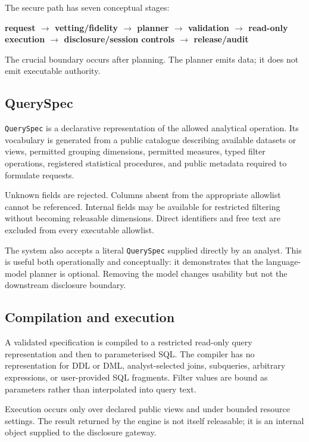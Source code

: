 \documentclass[11pt,a4paper]{article}
\begin{document}
The secure path has seven conceptual stages:

\begin{center}
\textbf{request $\rightarrow$ vetting/fidelity $\rightarrow$ planner $\rightarrow$
validation $\rightarrow$ read-only execution $\rightarrow$ disclosure/session
controls $\rightarrow$ release/audit}
\end{center}

The crucial boundary occurs after planning. The planner emits data; it does not
emit executable authority.

\subsection{QuerySpec}
\label{sec:queryspec}

\texttt{QuerySpec} is a declarative representation of the allowed analytical
operation. Its vocabulary is generated from a public catalogue describing
available datasets or views, permitted grouping dimensions, permitted measures,
typed filter operations, registered statistical procedures, and public metadata
required to formulate requests.

Unknown fields are rejected. Columns absent from the appropriate allowlist
cannot be referenced. Internal fields may be available for restricted filtering
without becoming releasable dimensions. Direct identifiers and free text are
excluded from every executable allowlist.

The system also accepts a literal \texttt{QuerySpec} supplied directly by an
analyst. This is useful both operationally and conceptually: it demonstrates
that the language-model planner is optional. Removing the model changes
usability but not the downstream disclosure boundary.

\subsection{Compilation and execution}
\label{sec:execution}

A validated specification is compiled to a restricted read-only query
representation and then to parameterised SQL. The compiler has no
representation for DDL or DML, analyst-selected joins, subqueries, arbitrary
expressions, or user-provided SQL fragments. Filter values are bound as
parameters rather than interpolated into query text.

Execution occurs only over declared public views and under bounded resource
settings. The result returned by the engine is not itself releasable; it is an
internal object supplied to the disclosure gateway.
\end{document}
